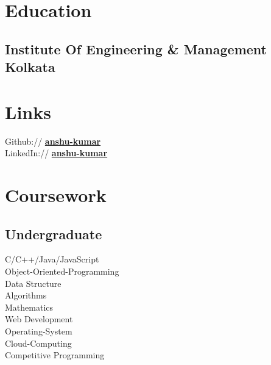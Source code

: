 \documentclass[]{deedy-resume-openfont}
\begin{document}
%
%

%
%

%
%

\begin{minipage}[t]{0.30\textwidth} 


\section{Education} 

\subsection{Institute Of Engineering \& Management Kolkata}


\section{Links} 
Github:// \href{https://github.com/Anshuvats}{\bf anshu-kumar} \\
LinkedIn://  \href{https://www.linkedin.com/in/unstoppable-anshu/}{\bf anshu-kumar} \\


\section{Coursework}
\subsection{Undergraduate}
C/C++/Java/JavaScript \\
Object-Oriented-Programming \\
Data Structure \\
Algorithms \\
Mathematics \\
Web Development \\
Operating-System \\
Cloud-Computing  \\
Competitive Programming \\


\end{minipage}
\end{document}

